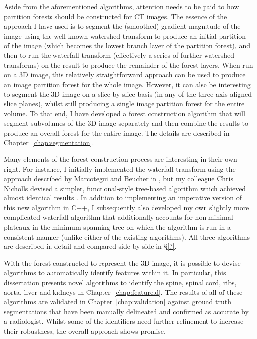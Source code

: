 Aside from the aforementioned algorithms, attention needs to be paid to how partition forests should be constructed for CT images. The essence of the approach I have used is to segment the (smoothed) gradient magnitude of the image using the well-known watershed transform \cite{beucher90} to produce an initial partition of the image (which becomes the lowest branch layer of the partition forest), and then to run the waterfall transform \cite{marcotegui05} (effectively a series of further watershed transforms) on the result to produce the remainder of the forest layers. When run on a 3D image, this relatively straightforward approach can be used to produce an image partition forest for the whole image. However, it can also be interesting to segment the 3D image on a slice-by-slice basis (in any of the three axis-aligned slice planes), whilst still producing a single image partition forest for the entire volume. To that end, I have developed a forest construction algorithm that will segment subvolumes of the 3D image separately and then combine the results to produce an overall forest for the entire image. The details are described in Chapter~\ref{chap:segmentation}.

Many elements of the forest construction process are interesting in their own right. For instance, I initially implemented the waterfall transform using the approach described by Marcotegui and Beucher in \cite{marcotegui05}, but my colleague Chris Nicholls devised a simpler, functional-style tree-based algorithm which achieved almost identical results \cite{nicholls09}. In addition to implementing an imperative version of this new algorithm in C++, I subsequently also developed my own slightly more complicated waterfall algorithm that additionally accounts for non-minimal plateaux in the minimum spanning tree on which the algorithm is run in a consistent manner (unlike either of the existing algorithms). All three algorithms are described in detail and compared side-by-side in \S\ref{?}.

With the forest constructed to represent the 3D image, it is possible to devise algorithms to automatically identify features within it. In particular, this dissertation presents novel algorithms to identify the spine, spinal cord, ribs, aorta, liver and kidneys in Chapter~\ref{chap:featureid}. The results of all of these algorithms are validated in Chapter~\ref{chap:validation} against ground truth segmentations that have been manually delineated and confirmed as accurate by a radiologist. Whilst some of the identifiers need further refinement to increase their robustness, the overall approach shows promise.

